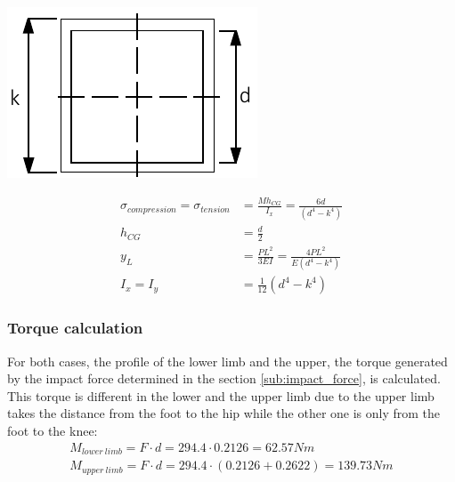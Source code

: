   \noindent\begin{minipage}{0.2\textwidth}%
      \includegraphics[width=\linewidth]{figures/profile_squared.pdf}
  \end{minipage}%
  \hfill%
  \begin{minipage}{0.8\textwidth}
    \begin{equation}
    \begin{aligned}
      \sigma _{compression} = \sigma _{tension} &= \frac{M h_{CG}}{I_x} = \frac{6 d}{(d^4 - k^4)}\\
      h_{CG} &= \frac{d}{2} \\
      y_L &= \frac{P L^2}{3EI} = \frac{4 P L^2}{E (d^4 - k^4)}\\
      I_x = I_y &= \frac{1}{12} (d^4 - k^4)
      \end{aligned}
    \end{equation}
  \end{minipage}

\subsubsection{Torque calculation} %
\label{ssub:torque_calculation}
  For both cases, the profile of the lower limb and the upper, the torque generated by the impact force determined in the section \ref{sub:impact_force}, is calculated.
  This torque is different in the lower and the upper limb due to the upper limb takes the distance from the foot to the hip while the other one is only from the foot to the knee:
  \begin{equation}
  \begin{aligned}
     M_{lower\ limb} = F \cdot d = 294.4 \cdot 0.2126 = 62.57 Nm\\
     M_{upper\ limb} = F \cdot d = 294.4 \cdot (0.2126 + 0.2622) = 139.73 Nm
  \end{aligned}
  \end{equation}

